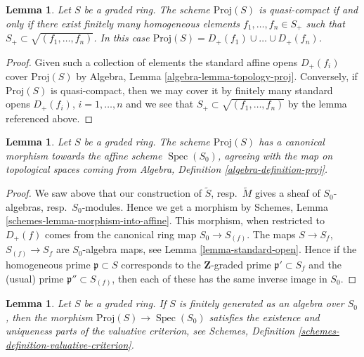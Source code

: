 \documentclass{stacks-project}
\theoremstyle{plain}
\newtheorem{lemma}[subsection]{Lemma}
\theoremstyle{definition}
\theoremstyle{remark}
\numberwithin{equation}{subsection}
\def\Spec{\mathop{\mathrm{Spec}}}
\begin{document}
\begin{lemma}
\label{lemma-proj-quasi-compact}
Let $S$ be a graded ring.
The scheme $\text{Proj}(S)$ is quasi-compact if and only
if there exist finitely many homogeneous elements
$f_1, \ldots, f_n \in S_{+}$ such that
$S_{+} \subset \sqrt{(f_1, \ldots, f_n)}$. In this case
$\text{Proj}(S) = D_+(f_1) \cup \ldots \cup D_+(f_n)$.
\end{lemma}

\begin{proof}
Given such a collection of elements the standard affine opens
$D_{+}(f_i)$ cover $\text{Proj}(S)$ by
Algebra, Lemma \ref{algebra-lemma-topology-proj}.
Conversely, if $\text{Proj}(S)$ is quasi-compact, then we
may cover it by finitely many standard opens
$D_{+}(f_i)$, $i = 1, \ldots, n$ and we see that
$S_{+} \subset \sqrt{(f_1, \ldots, f_n)}$ by the
lemma referenced above.
\end{proof}

\begin{lemma}
\label{lemma-structure-morphism-proj}
Let $S$ be a graded ring. The scheme $\text{Proj}(S)$ has a canonical morphism
towards the affine scheme $\Spec(S_0)$, agreeing with the map on
topological spaces coming from
Algebra, Definition \ref{algebra-definition-proj}.
\end{lemma}

\begin{proof}
We saw above that our construction of $\widetilde S$,
resp.\ $\widetilde M$ gives a sheaf of $S_0$-algebras, resp.\ $S_0$-modules.
Hence we get a morphism by
Schemes, Lemma \ref{schemes-lemma-morphism-into-affine}.
This morphism, when restricted to $D_{+}(f)$ comes from the
canonical ring map $S_0 \to S_{(f)}$. The maps
$S \to S_f$, $S_{(f)} \to S_f$ are $S_0$-algebra maps, see
Lemma \ref{lemma-standard-open}.
Hence if the homogeneous prime $\mathfrak p \subset S$
corresponds to the $\mathbf{Z}$-graded prime $\mathfrak p' \subset S_f$
and the (usual) prime $\mathfrak p'' \subset S_{(f)}$, then
each of these has the same inverse image in $S_0$.
\end{proof}

\begin{lemma}
\label{lemma-proj-valuative-criterion}
Let $S$ be a graded ring. If $S$ is finitely generated as
an algebra over $S_0$, then
the morphism $\text{Proj}(S) \to \Spec(S_0)$ satisfies
the existence and uniqueness parts of the valuative criterion,
see Schemes, Definition \ref{schemes-definition-valuative-criterion}.
\end{lemma}
\end{document}
